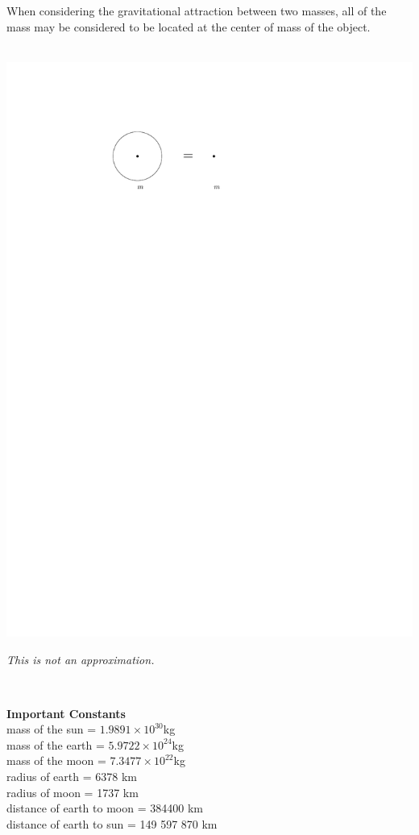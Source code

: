 \documentclass[12pt]{report}
\newcommand{ \probDir}[1]{{ \bf\small #1 \mbox{  }}}
\begin{document}
\hfill \parbox{10 cm}{When considering the gravitational attraction between two masses, all of the mass may be considered to be located at the center of mass of the object.} \hfill \mbox{} \\

\hfill \includegraphics{cmEquiv} \hfill \mbox{} \\

\hfill \parbox{10cm}{\centering \emph{This is not an approximation.}} \hfill \mbox{} \\
\vspace{1cm}

\probDir{Important Constants} \\
mass of the sun = $1.9891 \times 10^{30}$kg \\
mass of the earth = $5.9722 \times 10^{24}$kg \\
mass of the moon = $7.3477 \times 10^{22}$kg\\
radius of earth = 6378 km \\
radius of moon = 1737 km \\
distance of earth to moon = 384400 km \\
distance of earth to sun = 149 597 870 km \\
\end{document}
